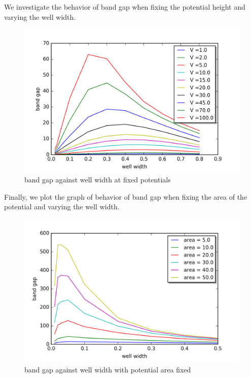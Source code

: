 We investigate the behavior of band gap when fixing the potential height and varying the well width. 

\begin{figure}[h]
\centering
\includegraphics[scale=.8]{Bandgap/complete_change_well_width.png}
\caption{band gap against well width at fixed potentials}
\label{fig:band gap against well width fixed potential}
\end{figure}
\newpage 
Finally, we plot the graph of behavior of band gap when fixing the area of the potential and varying the well width.

\begin{figure}[h]
\centering
\includegraphics[scale=.8]{Bandgap/change_area5_to_50.png}
\caption{band gap against well width with potential area fixed}
\label{fig:bang gap against well width fixed area}
\end{figure}



